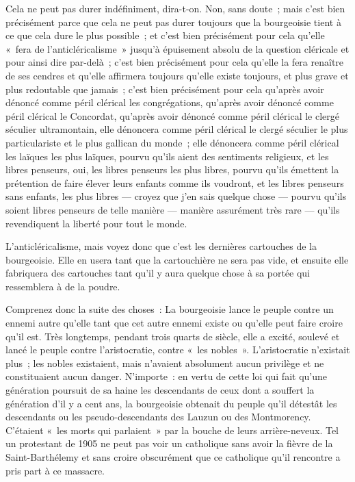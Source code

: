 \documentclass[french,twoside]{book} %
\begin{document}
 Cela ne peut pas durer indéfiniment, dira-t-on. Non, sans doute ; mais c’est bien précisément parce que cela ne peut pas durer toujours que la bourgeoisie tient à ce que cela dure le plus possible ; et c’est bien précisément pour cela qu’elle « fera de l’anticléricalisme » jusqu’à épuisement absolu de la question cléricale et pour ainsi dire par-delà ; c’est bien précisément pour cela qu’elle la fera renaître de ses cendres et qu’elle affirmera toujours qu’elle existe toujours, et plus grave et plus redoutable que jamais ; c’est bien précisément pour cela qu’après avoir dénoncé comme péril clérical les congrégations, qu’après avoir dénoncé comme péril clérical le Concordat, qu’après avoir dénoncé comme péril clérical le clergé séculier ultramontain, elle dénoncera comme péril clérical le clergé séculier le plus particulariste et le plus gallican du monde ; elle dénoncera comme péril clérical les laïques les plus laïques, pourvu qu’ils aient des sentiments religieux, et les libres penseurs, oui, les libres penseurs les plus libres, pourvu qu’ils émettent la prétention de faire élever leurs enfants comme ils voudront, et les libres penseurs sans enfants, les plus libres — croyez que j’en sais quelque chose — pourvu qu’ils soient libres penseurs de telle manière — manière assurément très rare — qu’ils  revendiquent la liberté pour tout le monde.\par
L’anticléricalisme, mais voyez donc que c’est les dernières cartouches de la bourgeoisie. Elle en usera tant que la cartouchière ne sera pas vide, et ensuite elle fabriquera des cartouches tant qu’il y aura quelque chose à sa portée qui ressemblera à de la poudre.\par
Comprenez donc la suite des choses : La bourgeoisie lance le peuple contre un ennemi autre qu’elle tant que cet autre ennemi existe ou qu’elle peut faire croire qu’il est. Très longtemps, pendant trois quarts de siècle, elle a excité, soulevé et lancé le peuple contre l’aristocratie, contre « les nobles ». L’aristocratie n’existait plus ; les nobles existaient, mais n’avaient absolument aucun privilège et ne constituaient aucun danger. N’importe : en vertu de cette loi qui fait qu’une génération poursuit de sa haine les descendants de ceux dont a souffert la génération d’il y a cent ans, la bourgeoisie obtenait du peuple qu’il détestât les descendants ou les pseudo-descendants des Lauzun ou des Montmorency. C’étaient « les morts qui parlaient » par la bouche de leurs arrière-neveux. Tel un protestant de 1905 ne peut pas voir un catholique sans avoir la fièvre de la Saint-Barthélemy et sans croire obscurément que ce catholique qu’il rencontre a pris part à ce massacre.\par
\end{document}
